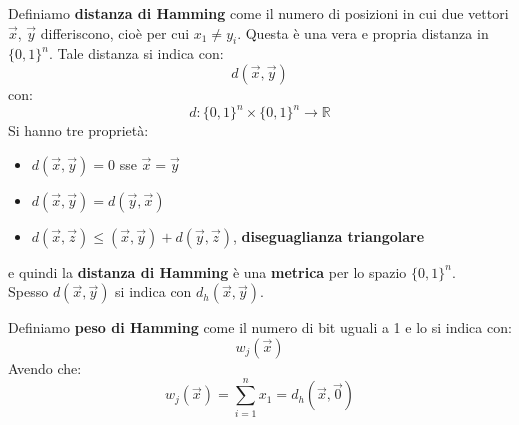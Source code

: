 \documentclass[a4paper,12pt, oneside]{book}
\begin{document}
\begin{definizione}
  Definiamo \textbf{distanza di Hamming} come il numero di posizioni in cui due
  vettori $\vec{x}$, $\vec{y}$ differiscono, cioè per cui $x_1\neq y_i$. Questa
  è una vera e propria distanza in $\{0,1\}^n$. Tale distanza si indica con:
  \[d(\vec{x},\vec{y})\]
  con:
  \[d:\{0,1\}^n\times\{0,1\}^n\to\mathbb{R}\]
  Si hanno tre proprietà:
  \begin{itemize}
    \item $d(\vec{x},\vec{y})=0$ sse $\vec{x}=\vec{y}$
    \item $d(\vec{x},\vec{y})=d(\vec{y},\vec{x})$
    \item $d(\vec{x},\vec{z})\leq(\vec{x},\vec{y})+d(\vec{y},\vec{z})$,
    \textbf{diseguaglianza triangolare}
  \end{itemize}
  e quindi la \textbf{distanza di Hamming} è una \textbf{metrica} per lo spazio
  $\{0,1\}^n$.\\
  Spesso $d(\vec{x},\vec{y})$ si indica con $d_h(\vec{x},\vec{y})$.
\end{definizione}
\begin{definizione}
  Definiamo \textbf{peso di Hamming} come il numero di bit uguali a 1 e lo si
  indica con:
  \[w_j(\vec{x})\]
  Avendo che:
  \[w_j(\vec{x})=\sum_{i=1}^n x_1=d_h(\vec{x},\vec{0})\]
\end{definizione}
\end{document}
